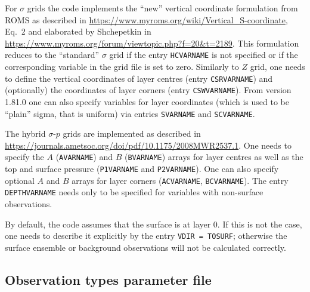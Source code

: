 \documentclass[11pt]{report}
\begin{document}
For $\sigma$ grids the code implements the ``new'' vertical coordinate formulation from ROMS as described in \url{https://www.myroms.org/wiki/Vertical_S-coordinate}, Eq.~2 and elaborated by Shchepetkin in \url{https://www.myroms.org/forum/viewtopic.php?f=20&t=2189}.
This formulation reduces to the ``standard'' $\sigma$ grid if the entry \verb|HCVARNAME| is not specified or if the corresponding variable in the grid file is set to zero.
Similarly to $Z$ grid, one needs to define the vertical coordinates of layer centres (entry \verb|CSRVARNAME|) and (optionally) the coordinates of layer corners (entry \verb|CSWVARNAME|).
From version 1.81.0 one can also specify variables for layer coordinates (which is used to be ``plain'' sigma, that is uniform) via entries \verb|SVARNAME| and \verb|SCVARNAME|.

The hybrid $\sigma$-$p$ grids are implemented as described in \url{https://journals.ametsoc.org/doi/pdf/10.1175/2008MWR2537.1}.
One needs to specify the $A$ (\verb|AVARNAME|) and $B$ (\verb|BVARNAME|) arrays for layer centres as well as the top and surface pressure (\verb|P1VARNAME| and \verb|P2VARNAME|).
One can also specify optional $A$ and $B$ arrays for layer corners (\verb|ACVARNAME|, \verb|BCVARNAME|).
The entry \verb|DEPTHVARNAME| needs only to be specified for variables with non-surface observations.

By default, the code assumes that the surface is at layer 0.
If this is not the case, one needs to describe it explicitly by the entry \verb|VDIR = TOSURF|; otherwise the surface ensemble or background observations will not be calculated correctly.

\subsection{Observation types parameter file}
\label{sec:obstypesprm}
\end{document}
